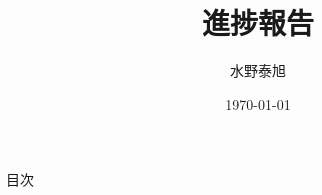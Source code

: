 \documentclass[leno,xcolor=dvipsnames]{beamer}
\title{進捗報告}
\date{\today}
\author{水野泰旭}
\institute{弘前大学理工学部電子情報工学科４年}
\begin{document}
  \maketitle

  \begin{frame}{目次}
    \tableofcontents
  \end{frame}
\end{document}
